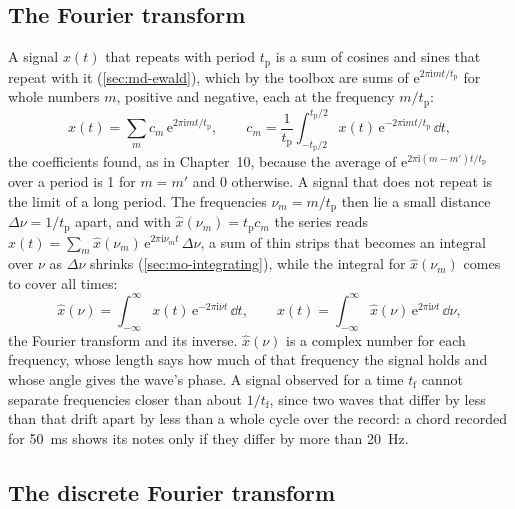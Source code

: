 \subsection*{The Fourier transform}

A signal $x(t)$ that repeats with period $t_{\mathrm p}$ is a sum of
cosines and sines that repeat with it (\cref{sec:md-ewald}), which by the
toolbox are sums of $\mathrm{e}^{2\pi\mathrm{i}mt/t_{\mathrm p}}$ for whole
numbers $m$, positive and negative, each at the frequency $m/t_{\mathrm
p}$:
\begin{equation*}
   x(t) = \sum_mc_m\,\mathrm{e}^{2\pi\mathrm{i}mt/t_{\mathrm p}} , \qquad
   c_m = \frac{1}{t_{\mathrm p}}\int_{-t_{\mathrm p}/2}^{t_{\mathrm p}/2}
   x(t)\,\mathrm{e}^{-2\pi\mathrm{i}mt/t_{\mathrm p}}\,\dd t ,
\end{equation*}
the coefficients found, as in Chapter~10, because the average of
$\mathrm{e}^{2\pi\mathrm{i}(m - m')t/t_{\mathrm p}}$ over a period is 1 for
$m = m'$ and 0 otherwise. A signal that does not repeat is the limit of a
long period. The frequencies $\nu_m = m/t_{\mathrm p}$ then lie a small
distance $\Delta\nu = 1/t_{\mathrm p}$ apart, and with $\hat x(\nu_m) =
t_{\mathrm p}c_m$ the series reads $x(t) = \sum_m\hat x(\nu_m)\,
\mathrm{e}^{2\pi\mathrm{i}\nu_mt}\,\Delta\nu$, a sum of thin strips that
becomes an integral over $\nu$ as $\Delta\nu$ shrinks
(\cref{sec:mo-integrating}), while the integral for $\hat x(\nu_m)$ comes
to cover all times:
\begin{equation}
   \hat x(\nu) = \int_{-\infty}^{\infty}x(t)\,\mathrm{e}^{-2\pi\mathrm{i}
   \nu t}\,\dd t , \qquad
   x(t) = \int_{-\infty}^{\infty}\hat x(\nu)\,\mathrm{e}^{2\pi\mathrm{i}
   \nu t}\,\dd\nu ,
   \label{eq:ob-ft}
\end{equation}
the Fourier transform and its inverse. $\hat x(\nu)$ is a complex number
for each frequency, whose length says how much of that frequency the
signal holds and whose angle gives the wave's phase. A signal observed
for a time $t_{\mathrm f}$ cannot separate frequencies closer than about $1/t_{\mathrm f}$, since
two waves that differ by less than that drift apart by less than a whole
cycle over the record: a chord recorded for \SI{50}{\milli\second} shows
its notes only if they differ by more than \SI{20}{\hertz}.

\subsection*{The discrete Fourier transform}

